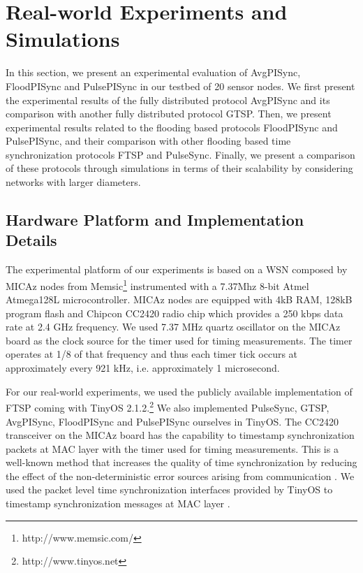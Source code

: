 \documentclass[english,a4paper,10pt,final]{article}
\numberwithin{equation}{section}
\numberwithin{figure}{section}
\begin{document}
\section{Real-world Experiments and Simulations}
\label{sec:Experiments}

In this section, we present an experimental evaluation of AvgPISync, FloodPISync and PulsePISync in our testbed of 20 sensor nodes. We first present the experimental results of the fully distributed protocol AvgPISync and its comparison with another fully distributed protocol GTSP. Then, we present experimental results related to the flooding based protocols FloodPISync and PulsePISync, and their comparison with other flooding based time synchronization protocols FTSP and PulseSync. Finally, we present a comparison of these protocols through simulations in terms of their scalability by considering networks with larger diameters.

\subsection{Hardware Platform and Implementation Details}

The experimental platform of our experiments is based on a WSN composed by MICAz nodes from Memsic\footnote{http://www.memsic.com/} instrumented with a 7.37Mhz 8-bit Atmel Atmega128L microcontroller. MICAz nodes are equipped with 4kB RAM, 128kB program flash and Chipcon CC2420 radio chip which provides a 250 kbps data rate at 2.4 GHz frequency. We used 7.37 MHz quartz oscillator on the MICAz board as the clock source for the timer used for timing measurements. The timer operates at 1/8 of that frequency and thus each timer tick occurs at approximately every 921 kHz, i.e. approximately 1 microsecond.

For our real-world experiments, we used the publicly available implementation of FTSP coming with TinyOS 2.1.2.\footnote{http://www.tinyos.net} We also implemented PulseSync, GTSP, AvgPISync, FloodPISync and PulsePISync ourselves in TinyOS. The CC2420 transceiver on the MICAz board has the capability to timestamp synchronization packets at MAC layer  with the timer used for timing measurements. This is a well-known method that increases the quality of time synchronization by reducing the effect of the non-deterministic error sources arising from communication \cite{Maroti2004}. We used the packet level time synchronization interfaces provided by TinyOS to timestamp synchronization messages at MAC layer \cite{Packet-level-time-synchronization:2008}.
\end{document}
